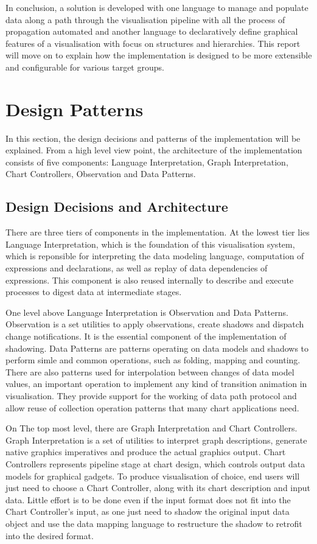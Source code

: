 \documentclass[11pt, a4paper]{report}
\begin{document}
In conclusion, a solution is developed with one language to manage and populate data along a path through the visualisation pipeline with all the process of propagation automated and another language to declaratively define graphical features of a visualisation with focus on structures and hierarchies. This report will move on to explain how the implementation is designed to be more extensible and configurable for various target groups.

\chapter{Design Patterns}
In this section, the design decisions and patterns of the implementation will be explained. From a high level view point, the architecture of the implementation consists of five components: Language Interpretation, Graph Interpretation, Chart Controllers, Observation and Data Patterns.
\section{Design Decisions and Architecture}
There are three tiers of components in the implementation. At the lowest tier lies Language Interpretation, which is the foundation of this visualisation system, which is reponsible for interpreting the data modeling language, computation of expressions and declarations, as well as replay of data dependencies of expressions. This component is also reused internally to describe and execute processes to digest data at intermediate stages.

One level above Language Interpretation is Observation and Data Patterns. Observation is a set utilities to apply observations, create shadows and dispatch change notifications. It is the essential component of the implementation of shadowing. Data Patterns are patterns operating on data models and shadows to perform simle and common operations, such as folding, mapping and counting. There are also patterns used for interpolation between changes of data model values, an important operation to implement any kind of transition animation in visualisation. They provide support for the working of data path protocol and allow reuse of collection operation patterns that many chart applications need.

On The top most level, there are Graph Interpretation and Chart Controllers. Graph Interpretation is a set of utilities to interpret graph descriptions, generate native graphics imperatives and produce the actual graphics output. Chart Controllers represents pipeline stage at chart design, which controls output data models for graphical gadgets. To produce visualisation of choice, end users will just need to choose a Chart Controller, along with its chart description and input data. Little effort is to be done even if the input format does not fit into the Chart Controller's input, as one just need to shadow the original input data object and use the data mapping language to restructure the shadow to retrofit into the desired format.
\end{document}
